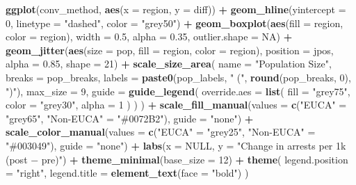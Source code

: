 \documentclass[
]{article}
\newenvironment{Shaded}{\begin{snugshade}}{\end{snugshade}}
\newcommand{\AttributeTok}[1]{\textcolor[rgb]{0.13,0.29,0.53}{#1}}
\newcommand{\ConstantTok}[1]{\textcolor[rgb]{0.56,0.35,0.01}{#1}}
\newcommand{\DecValTok}[1]{\textcolor[rgb]{0.00,0.00,0.81}{#1}}
\newcommand{\FloatTok}[1]{\textcolor[rgb]{0.00,0.00,0.81}{#1}}
\newcommand{\FunctionTok}[1]{\textcolor[rgb]{0.13,0.29,0.53}{\textbf{#1}}}
\newcommand{\NormalTok}[1]{#1}
\newcommand{\OtherTok}[1]{\textcolor[rgb]{0.56,0.35,0.01}{#1}}
\newcommand{\SpecialCharTok}[1]{\textcolor[rgb]{0.81,0.36,0.00}{\textbf{#1}}}
\newcommand{\StringTok}[1]{\textcolor[rgb]{0.31,0.60,0.02}{#1}}
\begin{document}
\begin{Shaded}
\begin{Highlighting}[]
\FunctionTok{ggplot}\NormalTok{(conv\_method, }\FunctionTok{aes}\NormalTok{(}\AttributeTok{x =}\NormalTok{ region, }\AttributeTok{y =}\NormalTok{ diff)) }\SpecialCharTok{+}
  \FunctionTok{geom\_hline}\NormalTok{(}\AttributeTok{yintercept =} \DecValTok{0}\NormalTok{, }\AttributeTok{linetype =} \StringTok{"dashed"}\NormalTok{, }\AttributeTok{color =} \StringTok{"grey50"}\NormalTok{) }\SpecialCharTok{+}
  \FunctionTok{geom\_boxplot}\NormalTok{(}\FunctionTok{aes}\NormalTok{(}\AttributeTok{fill =}\NormalTok{ region, }\AttributeTok{color =}\NormalTok{ region), }\AttributeTok{width =} \FloatTok{0.5}\NormalTok{, }\AttributeTok{alpha =} \FloatTok{0.35}\NormalTok{, }\AttributeTok{outlier.shape =} \ConstantTok{NA}\NormalTok{) }\SpecialCharTok{+}
  \FunctionTok{geom\_jitter}\NormalTok{(}\FunctionTok{aes}\NormalTok{(}\AttributeTok{size =}\NormalTok{ pop, }\AttributeTok{fill =}\NormalTok{ region, }\AttributeTok{color =}\NormalTok{ region), }\AttributeTok{position =}\NormalTok{ jpos, }\AttributeTok{alpha =} \FloatTok{0.85}\NormalTok{, }\AttributeTok{shape =} \DecValTok{21}\NormalTok{) }\SpecialCharTok{+}
  \FunctionTok{scale\_size\_area}\NormalTok{(}
    \AttributeTok{name =} \StringTok{"Population Size"}\NormalTok{,}
    \AttributeTok{breaks =}\NormalTok{ pop\_breaks,}
    \AttributeTok{labels =} \FunctionTok{paste0}\NormalTok{(pop\_labels, }\StringTok{" ("}\NormalTok{, }\FunctionTok{round}\NormalTok{(pop\_breaks, }\DecValTok{0}\NormalTok{), }\StringTok{")"}\NormalTok{),}
    \AttributeTok{max\_size =} \DecValTok{9}\NormalTok{,}
    \AttributeTok{guide =} \FunctionTok{guide\_legend}\NormalTok{(}
      \AttributeTok{override.aes =} \FunctionTok{list}\NormalTok{(}
        \AttributeTok{fill =} \StringTok{"grey75"}\NormalTok{,    }
        \AttributeTok{color =} \StringTok{"grey30"}\NormalTok{,}
        \AttributeTok{alpha =} \DecValTok{1}
\NormalTok{      )}
\NormalTok{    )}
\NormalTok{  ) }\SpecialCharTok{+}
  \FunctionTok{scale\_fill\_manual}\NormalTok{(}\AttributeTok{values =} \FunctionTok{c}\NormalTok{(}\StringTok{"EUCA"} \OtherTok{=} \StringTok{"grey65"}\NormalTok{, }\StringTok{"Non{-}EUCA"} \OtherTok{=} \StringTok{"\#0072B2"}\NormalTok{), }\AttributeTok{guide =} \StringTok{"none"}\NormalTok{) }\SpecialCharTok{+}
  \FunctionTok{scale\_color\_manual}\NormalTok{(}\AttributeTok{values =} \FunctionTok{c}\NormalTok{(}\StringTok{"EUCA"} \OtherTok{=} \StringTok{"grey25"}\NormalTok{, }\StringTok{"Non{-}EUCA"} \OtherTok{=} \StringTok{"\#003049"}\NormalTok{), }\AttributeTok{guide =} \StringTok{"none"}\NormalTok{) }\SpecialCharTok{+}
  \FunctionTok{labs}\NormalTok{(}\AttributeTok{x =} \ConstantTok{NULL}\NormalTok{, }\AttributeTok{y =} \StringTok{"Change in arrests per 1k (post − pre)"}\NormalTok{) }\SpecialCharTok{+}
  \FunctionTok{theme\_minimal}\NormalTok{(}\AttributeTok{base\_size =} \DecValTok{12}\NormalTok{) }\SpecialCharTok{+}
  \FunctionTok{theme}\NormalTok{(}
    \AttributeTok{legend.position =} \StringTok{"right"}\NormalTok{,}
    \AttributeTok{legend.title =} \FunctionTok{element\_text}\NormalTok{(}\AttributeTok{face =} \StringTok{"bold"}\NormalTok{)}
\NormalTok{  )}
\end{Highlighting}
\end{Shaded}
\end{document}
